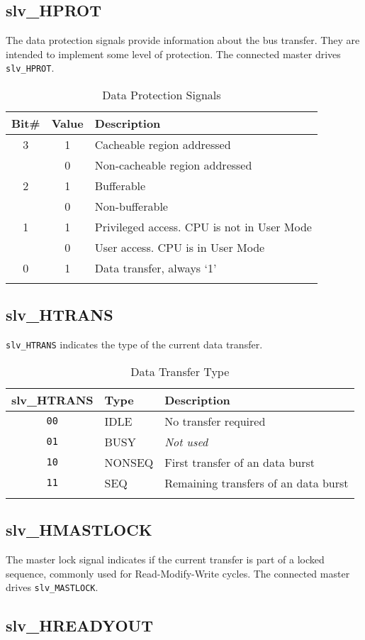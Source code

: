 \subsection{slv\_HPROT}\label{slv_hprot}

The data protection signals provide information about the bus transfer.
They are intended to implement some level of protection. The connected
master drives \texttt{slv\_HPROT}.

\begin{longtable}[]{@{}ccl@{}}
\toprule
Bit\# & Value & Description\tabularnewline
\midrule
\endhead
3 & 1 & Cacheable region addressed\tabularnewline
& 0 & Non-cacheable region addressed\tabularnewline
2 & 1 & Bufferable\tabularnewline
& 0 & Non-bufferable\tabularnewline
1 & 1 & Privileged access. CPU is not in User Mode\tabularnewline
& 0 & User access. CPU is in User Mode\tabularnewline
0 & 1 & Data transfer, always `1'\tabularnewline
\bottomrule
\caption{Data Protection Signals}
\end{longtable}

\subsection{slv\_HTRANS}\label{slv_htrans}

\texttt{slv\_HTRANS} indicates the type of the current data transfer.

\begin{longtable}[]{@{}cll@{}}
\toprule
slv\_HTRANS & Type & Description\tabularnewline
\midrule
\endhead
\texttt{00} & IDLE & No transfer required\tabularnewline
\texttt{01} & BUSY & \emph{Not used}\tabularnewline
\texttt{10} & NONSEQ & First transfer of an data burst\tabularnewline
\texttt{11} & SEQ & Remaining transfers of an data burst\tabularnewline
\bottomrule
\caption{Data Transfer Type}
\end{longtable}

\subsection{slv\_HMASTLOCK}\label{slv_hmastlock}

The master lock signal indicates if the current transfer is part of a
locked sequence, commonly used for Read-Modify-Write cycles. The
connected master drives \texttt{slv\_MASTLOCK}.

\subsection{slv\_HREADYOUT}\label{slv_hreadyout}

